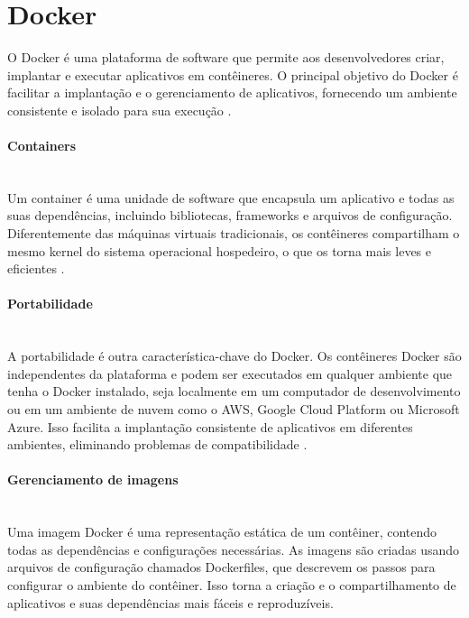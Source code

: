 \section{Docker}

O Docker é uma plataforma de software que permite aos desenvolvedores criar, implantar e executar aplicativos em contêineres. O principal objetivo do Docker é facilitar a implantação e o gerenciamento de aplicativos, fornecendo um ambiente consistente e isolado para sua execução \cite{docker-docs}.

\paragraph*{Containers}\mbox{}\\
 Um container é uma unidade de software que encapsula um aplicativo e todas as suas dependências, incluindo bibliotecas, frameworks e arquivos de configuração. Diferentemente das máquinas virtuais tradicionais, os contêineres compartilham o mesmo kernel do sistema operacional hospedeiro, o que os torna mais leves e eficientes \cite{linux-containers-virtualization,docker-docs}.

\paragraph*{Portabilidade}\mbox{}\\
A portabilidade é outra característica-chave do Docker. Os contêineres Docker são independentes da plataforma e podem ser executados em qualquer ambiente que tenha o Docker instalado, seja localmente em um computador de desenvolvimento ou em um ambiente de nuvem como o AWS, Google Cloud Platform ou Microsoft Azure. Isso facilita a implantação consistente de aplicativos em diferentes ambientes, eliminando problemas de compatibilidade \cite{docker-book,docker-aws}.

\paragraph*{Gerenciamento de imagens}\mbox{}\\

Uma imagem Docker é uma representação estática de um contêiner, contendo todas as dependências e configurações necessárias. As imagens são criadas usando arquivos de configuração chamados Dockerfiles, que descrevem os passos para configurar o ambiente do contêiner. Isso torna a criação e o compartilhamento de aplicativos e suas dependências mais fáceis e reproduzíveis.

